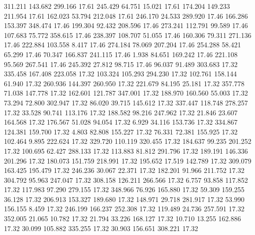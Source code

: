  311.211  143.682  299.166        17.61
 245.429   64.751   15.021        17.61
 174.204  149.233  211.954        17.61
 162.023   53.794  212.048        17.61
 246.170   24.533  289.920        17.46
 166.286  153.397  348.474        17.46
 199.304   92.432  208.596        17.46
 273.241  112.791   99.589        17.46
 107.683   75.772  358.615        17.46
 238.397  108.707   51.055        17.46
 160.306   79.311  271.136        17.46
 222.884  103.558    8.417        17.46
 274.184   78.069  207.204        17.46
 254.288   58.421   65.299        17.46
  70.347  166.837  241.115        17.46
   1.938   84.651  169.242        17.46
 221.108   95.569  267.541        17.46
 245.392   27.812   98.715        17.46
  96.037   91.489  303.683        17.32
 335.458  167.408  223.058        17.32
 103.324  105.293  294.230        17.32
 102.761  158.144   61.940        17.32
 260.936  144.397  260.950        17.32
 221.679   84.195   25.181        17.32
 357.778   71.038  147.778        17.32
 162.601  121.787  347.001        17.32
 188.970  160.560   55.003        17.32
  73.294   72.800  302.947        17.32
  86.020   39.715  145.612        17.32
 337.447  118.748  278.257        17.32
  33.528   90.741  113.176        17.32
 188.582   98.216  247.962        17.32
  21.846   23.607  164.568        17.32
 176.567   51.028   94.054        17.32
   6.929   34.116  153.736        17.32
 334.867  124.381  159.700        17.32
   4.803   82.808  155.227        17.32
  76.331   72.381  155.925        17.32
 102.464    9.895  222.624        17.32
 329.720  110.119  320.455        17.32
 184.637   99.235  201.252        17.32
 100.695   62.427  288.133        17.32
 113.883   81.812  291.796        17.32
 189.191  146.336  201.296        17.32
 180.073  151.759  218.991        17.32
 195.652   17.519  142.789        17.32
 309.079  163.425  195.479        17.32
 246.236   30.067   22.371        17.32
 182.201   91.966  211.752        17.32
 304.792   95.963  247.047        17.32
 308.158  126.211  266.566        17.32
   6.757   93.858  117.852        17.32
 117.983   97.290  279.155        17.32
 348.966   76.926  165.880        17.32
  59.309  159.255   36.128        17.32
 206.913  153.327  189.680        17.32
 148.971   29.718  281.917        17.32
  53.990  156.155    8.459        17.32
 246.199  166.237  252.308        17.32
 119.489   24.736  257.591        17.32
 352.005   21.065   10.782        17.32
  21.794   33.226  168.127        17.32
  10.710   13.255  162.886        17.32
  30.099  105.882  335.255        17.32
  30.903  156.651  308.221        17.32

